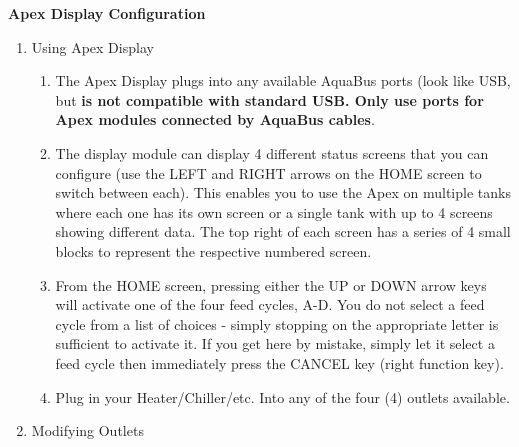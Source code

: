 \documentclass[
]{book}
\providecommand{\tightlist}{%
  \setlength{\itemsep}{0pt}\setlength{\parskip}{0pt}}
\begin{document}
\textbf{Apex Display Configuration}

\begin{enumerate}
\def\labelenumi{\arabic{enumi}.}
\tightlist
\item
  Using Apex Display

  \begin{enumerate}
  \def\labelenumii{\arabic{enumii}.}
  \tightlist
  \item
    The Apex Display plugs into any available AquaBus ports (look like USB, but \textbf{is not compatible with standard USB. Only use ports for Apex modules connected by AquaBus cables}.\\
  \item
    The display module can display 4 different status screens that you can configure (use the LEFT and RIGHT arrows on the HOME screen to switch between each). This enables you to use the Apex on multiple tanks where each one has its own screen or a single tank with up to 4 screens showing different data. The top right of each screen has a series of 4 small blocks to represent the respective numbered screen.\\
  \item
    From the HOME screen, pressing either the UP or DOWN arrow keys will activate one of the four feed cycles, A-D. You do not select a feed cycle from a list of choices - simply stopping on the appropriate letter is sufficient to activate it. If you get here by mistake, simply let it select a feed cycle then immediately press the CANCEL key (right function key).\\
  \item
    Plug in your Heater/Chiller/etc. Into any of the four (4) outlets available.\\
  \end{enumerate}
\item
  Modifying Outlets


\end{enumerate}
\end{document}
